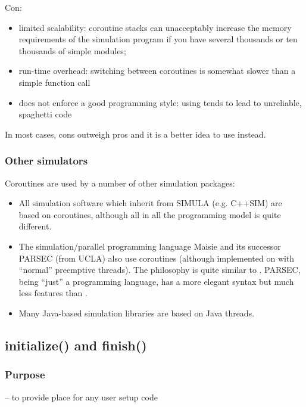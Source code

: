 Con:
\begin{itemize}
   \item{limited scalability: coroutine stacks can unacceptably increase the
       memory requirements of the simulation program if you have several
       thousands or ten thousands of simple modules;}
   \item{run-time overhead: switching between coroutines is somewhat slower
       than a simple function call}
   \item{does not enforce a good programming style: using 
       tends to lead to unreliable, spaghetti code}
\end{itemize}

In most cases, cons outweigh pros and it is a better idea to use
 instead.


\subsubsection{Other simulators}


Coroutines are used by a number of other simulation packages:
\begin{itemize}
\item{All simulation software which inherit from SIMULA (e.g. C++SIM)
    are based on coroutines, although all in all the programming
    model is quite different.}
\item{The simulation/parallel programming language Maisie and its successor
    PARSEC (from UCLA) also use coroutines (although implemented
    on with ``normal'' preemptive threads). The philosophy
    is quite similar to {\opp}. PARSEC, being ``just''
    a programming language, has a more elegant syntax but much less
    features than {\opp}.}
\item{Many Java-based simulation libraries are based on Java
    threads.}
\end{itemize}




\subsection{initialize() and finish()}

\subsubsection{Purpose}


 -- to provide place for any user setup code

